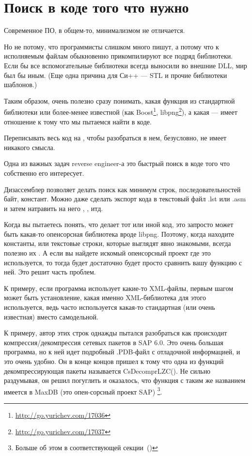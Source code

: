 \chapter{Поиск в коде того что нужно}

Современное ПО, в общем-то, минимализмом не отличается.

Но не потому, что программисты слишком много пишут, 
а потому что к исполняемым файлам обыкновенно прикомпилируют все подряд библиотеки. 
Если бы все вспомогательные библиотеки всегда выносили во внешние DLL, мир был бы иным.
(Еще одна причина для Си++ --- \ac{STL} и прочие библиотеки шаблонов.)

\newcommand{\FOOTNOTEBOOST}{\footnote{\url{http://go.yurichev.com/17036}}}
\newcommand{\FOOTNOTELIBPNG}{\footnote{\url{http://go.yurichev.com/17037}}}

Таким образом, очень полезно сразу понимать, какая функция из стандартной библиотеки или 
более-менее известной (как Boost\FOOTNOTEBOOST, libpng\FOOTNOTELIBPNG), 
а какая --- имеет отношение к тому что мы пытаемся найти в коде.

Переписывать весь код на \CCpp, чтобы разобраться в нем, безусловно, не имеет никакого смысла.

Одна из важных задач reverse engineer-а это быстрый поиск в коде того что собственно его интересует.

\myindex{\GrepUsage}
Дизассемблер \IDA позволяет делать поиск как минимум строк, последовательностей байт, констант.
Можно даже сделать экспорт кода в текстовый файл .lst или .asm и затем натравить на него , , итд.

Когда вы пытаетесь понять, что делает тот или иной код, это запросто может быть какая-то 
опенсорсная библиотека вроде libpng. Поэтому, когда находите константы, или текстовые строки, которые 
выглядят явно знакомыми, всегда полезно их .
А если вы найдете искомый опенсорсный проект где это используется, 
то тогда будет достаточно будет просто сравнить вашу функцию с ней. 
Это решит часть проблем.

К примеру, если программа использует какие-то XML-файлы, первым шагом может быть
установление, какая именно XML-библиотека для этого используется, ведь часто используется какая-то
стандартная (или очень известная) вместо самодельной.

К примеру, автор этих строк однажды пытался разобраться как происходит компрессия/декомпрессия сетевых пакетов в SAP 6.0. 
Это очень большая программа, но к ней идет подробный .\gls{PDB}-файл с отладочной информацией, и это очень удобно. 
Он в конце концов пришел к тому что одна из функций декомпрессирующая пакеты называется CsDecomprLZC(). 
Не сильно раздумывая, он решил погуглить и оказалось, что функция с таким же названием имеется в MaxDB
(это опен-сорсный проект SAP) \footnote{Больше об этом в соответствующей секции~()}.

